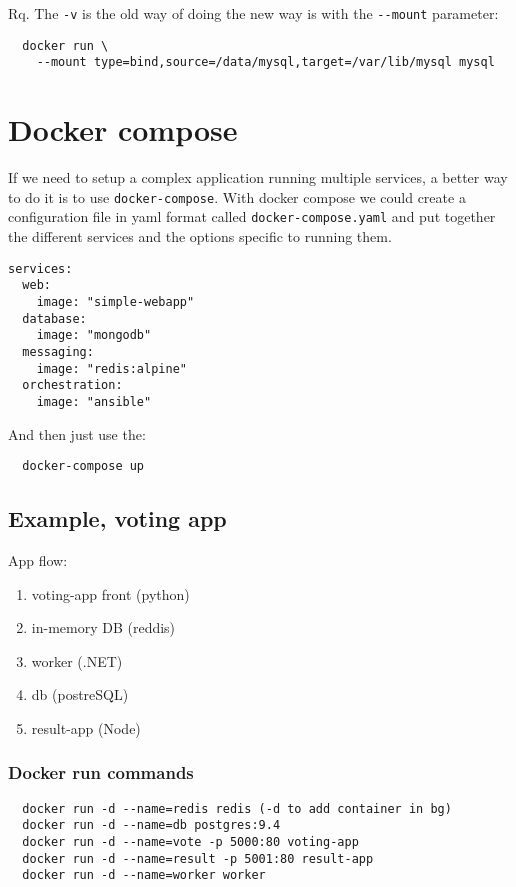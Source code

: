 \documentclass[french]{article}
\begin{document}
Rq. The \verb|-v| is the old way of doing the new way is with the \verb|--mount| parameter:
\begin{verbatim}
  docker run \
    --mount type=bind,source=/data/mysql,target=/var/lib/mysql mysql
\end{verbatim}

\section{Docker compose}

If we need to setup a complex application running multiple services, a better way to do it is to use \verb|docker-compose|. With docker compose we could create a configuration file in yaml format called \verb|docker-compose.yaml| and put together the different services and the options specific to running them.
\begin{verbatim}
services:
  web:
    image: "simple-webapp"
  database:
    image: "mongodb"
  messaging:
    image: "redis:alpine"
  orchestration:
    image: "ansible"
\end{verbatim}

And then just use the:
\begin{verbatim}
  docker-compose up
\end{verbatim}

\subsection{Example, voting app}

App flow:
\begin{enumerate}
  \item voting-app front (python)
  \item in-memory DB (reddis)
  \item worker (.NET)
  \item db (postreSQL)
  \item result-app (Node)
\end{enumerate}

\subsubsection{Docker run commands}
\begin{verbatim}
  docker run -d --name=redis redis (-d to add container in bg)
  docker run -d --name=db postgres:9.4
  docker run -d --name=vote -p 5000:80 voting-app
  docker run -d --name=result -p 5001:80 result-app
  docker run -d --name=worker worker
\end{verbatim}
\end{document}

